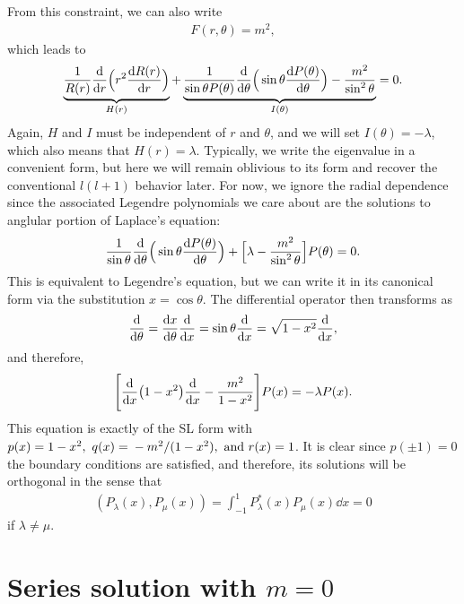 From this constraint, we can also write
\begin{align}
    F(r,\theta) = m^2
,\end{align}
which leads to
\begin{align}
    \underbrace{ \frac{1}{R(r)}\dv{r} \Big( r^2 \dv{R(r)}{r} \Big) }_{ H(r) } + \underbrace{ \frac{1}{\sin{\theta} P(\theta)} \dv{\theta} \Big( \sin{\theta} \dv{P(\theta)}{\theta} \Big) - \frac{m^2}{\sin^2{\theta}} }_{ I(\theta) } = 0
.\end{align}
Again, $H$ and $I$ must be independent of $r$ and $\theta$, and we will set $I(\theta) = -\lambda$, which also means that $H(r) = \lambda$.
Typically, we write the eigenvalue in a convenient form, but here we will remain oblivious to its form and recover the conventional $l(l+1)$ behavior later.
For now, we ignore the radial dependence since the associated Legendre polynomials we care about are the solutions to anglular portion of Laplace's equation:
\begin{align}
    \frac{1}{\sin{\theta}} \dv{\theta}\Big( \sin{\theta} \dv{P(\theta)}{\theta} \Big) + \Big[ \lambda - \frac{m^2}{\sin^2{\theta}} \Big] P(\theta) = 0
.\end{align}
This is equivalent to Legendre's equation, but we can write it in its canonical form via the substitution $x = \cos{\theta}$.
The differential operator then transforms as
\begin{eqnarray}
    \dv{\theta} = \dv{x}{\theta} \dv{x} = \sin{\theta} \dv{x} = \sqrt{1 - x^2} \dv{x}
,\end{eqnarray}
and therefore,
\begin{eqnarray}
    \label{eq:associated-legendre-eq}
    \Bigg[ \dv{x} (1 - x^2) \dv{x} - \frac{m^2}{1-x^2} \Bigg] P(x) = -\lambda P(x)
.\end{eqnarray}
This equation is exactly of the SL form with $p(x) = 1 - x^2,~ q(x) = \\ -m^2/(1-x^2),~{\rm and}~r(x) = 1$.
It is clear since $p(\pm 1) = 0$ the boundary conditions are satisfied, and therefore, its solutions will be orthogonal in the sense that
\begin{eqnarray}
    (P_{\lambda}(x),P_{\mu}(x)) = \int_{-1}^{1} P_{\lambda}^{*}(x) P_{\mu}(x) \dd{x} = 0
\end{eqnarray}
if $\lambda \ne \mu$.


\section{Series solution with $m=0$}

